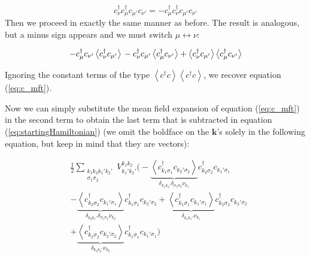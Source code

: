 \documentclass[10pt, twocolumn, twoside]{article}
\begin{document}
\begin{equation}
c_\nu^\dagger c_\mu^\dagger c_{\mu'} c_{\nu'} = - c_\mu^\dagger c_\nu^\dagger c_{\mu'} c_{\nu'}
\end{equation}
Then we proceed in exactly the same manner as before. The result is analogous, but a minus sign appears and we must switch $\mu \leftrightarrow \nu$:

\begin{equation}
- c_\mu^\dagger c_{\nu'} \left\langle c_\nu^\dagger c_{\mu'} \right\rangle \\
- c_\nu^\dagger c_{\mu'} \left\langle c_\mu^\dagger c_{\nu'} \right\rangle + \left\langle c_\nu^\dagger c_{\mu'} \right\rangle \left\langle c_\mu^\dagger c_{\nu'} \right\rangle
\end{equation}

Ignoring the constant terms of the type $\left\langle c^\dagger c \right\rangle \left\langle c^\dagger c \right\rangle$, we recover equation (\ref{eq:c_mft}).

Now we can simply substitute the mean field expansion of equation (\ref{eq:c_mft}) in the second term to  obtain the last term that is subtracted in equation (\ref{eq:startingHamiltonian}) (we omit the boldface on the $\bm k$'s solely in the following equation, but keep in mind that they are vectors):

\begin{equation}\label{eq:mean_field}
\begin{split}
&\frac{1}{2} \sum_{\substack{ k_1 k_2 k_1' k_2' \\ \sigma_1 \sigma_2} } V^{k_1 k_2}_{k_1' k_2'} \bigg( - \underbrace{\left\langle c_{k_1 \sigma_1}^\dagger c_{k_2' \sigma_2} \right\rangle}_{\delta_{k_1 k_2'} \delta_{\sigma_1 \sigma_2} \nu_{k_1} } c_{k_2 \sigma_2}^\dagger c_{k_1' \sigma_1} \\
& - \underbrace{\left\langle c_{k_2 \sigma_2}^\dagger c_{k_1' \sigma_1}  \right\rangle}_{\delta_{k_2 k_1'} \delta_{\sigma_1 \sigma_2} \nu_{k_2} } c_{k_1 \sigma_1}^\dagger c_{k_2' \sigma_2} + \underbrace{\left\langle c_{k_1 \sigma_1}^\dagger c_{k_1' \sigma_1} \right\rangle}_{\delta_{k_1 k_1'} \nu_{k_1} } c_{k_2 \sigma_2}^\dagger c_{k_2' \sigma_2}  \\
& + \underbrace{\left\langle c_{k_2 \sigma_2}^\dagger c_{k_2' \sigma_2} \right\rangle}_{\delta_{k_2 k_2'} \nu_{k_2} } c_{k_1 \sigma_1}^\dagger c_{k_1' \sigma_1} \bigg)\\
\end{split}
\end{equation}
\end{document}
